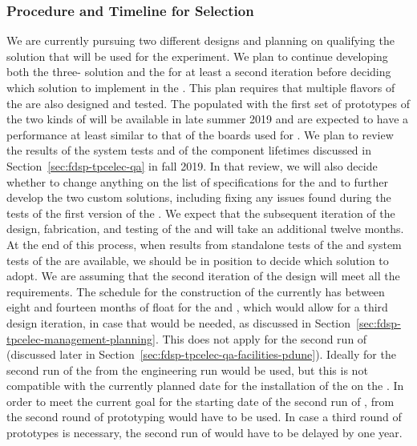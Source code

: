 \subsubsection{Procedure and Timeline for  Selection}
\label{sec:fdsp-tpcelec-design-femb-selection}

We are currently pursuing two different  designs and 
planning on qualifying the   solution that 
will be used for the  experiment.
We plan to continue developing both the three- 
solution and the   for at least a second 
iteration before deciding which  solution to 
implement in the  . This plan requires
that multiple flavors of the  are also designed 
and tested. The  populated with the first set of prototypes of 
the two kinds of  will be available in late summer 2019 
and are expected to have a performance at least similar to that 
of the boards used for . We plan to review the results 
of the system tests and of the component lifetimes discussed 
in Section~\ref{sec:fdsp-tpcelec-qa} in fall 2019. 
In that review, we will also decide whether to change anything on 
the list of specifications for the  and to further develop
the two custom  solutions, including fixing any 
issues found during the tests of the first version of the . 
We expect that the subsequent iteration
of the design, fabrication, and testing of the  and
 will take an additional twelve months. At the end 
of this process, when results from standalone tests of the
 and system tests of the  are
available, we should be in position to decide which 
solution to adopt. We are assuming that the second iteration of
the  design will meet all the  requirements.
The schedule for the construction of the  
currently has between eight and fourteen months of float for the
 and , which would allow for a third 
design iteration, in case that would be needed, as discussed
in Section~\ref{sec:fdsp-tpcelec-management-planning}. This does
not apply for the second run of  (discussed
later in Section~\ref{sec:fdsp-tpcelec-qa-facilities-pdune}).
Ideally for the second run of  the 
from the engineering run would be used, but this is not compatible
with the currently planned date for the installation of the 
on the . In order to meet the current goal for the starting
date of the second run of ,  from the
second round of prototyping would have to be used. In case a
third round of prototypes is necessary, the second run of 
 would have to be delayed by one year.

